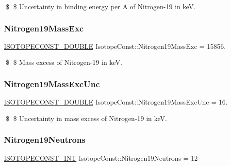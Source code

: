 \$ \$ Uncertainty in binding energy per A of Nitrogen-\/19 in keV. \mbox{\label{group___isotope_const-_nitrogen-_n19_ga2602baef8d8e6e13079427247e149719}} 
\subsubsection{\texorpdfstring{Nitrogen19\+Mass\+Exc}{Nitrogen19MassExc}}
{\footnotesize\ttfamily \mbox{\hyperlink{group___isotope_const-_macros_ga8f45a7272ce02c0b4c65c44636ed719a}{I\+S\+O\+T\+O\+P\+E\+C\+O\+N\+S\+T\+\_\+\+D\+O\+U\+B\+LE}} Isotope\+Const\+::\+Nitrogen19\+Mass\+Exc = 15856.}

\$ \$ Mass excess of Nitrogen-\/19 in keV. \mbox{\label{group___isotope_const-_nitrogen-_n19_gafb5e58f62f5e6fe8a36853d17649486b}} 
\subsubsection{\texorpdfstring{Nitrogen19\+Mass\+Exc\+Unc}{Nitrogen19MassExcUnc}}
{\footnotesize\ttfamily \mbox{\hyperlink{group___isotope_const-_macros_ga8f45a7272ce02c0b4c65c44636ed719a}{I\+S\+O\+T\+O\+P\+E\+C\+O\+N\+S\+T\+\_\+\+D\+O\+U\+B\+LE}} Isotope\+Const\+::\+Nitrogen19\+Mass\+Exc\+Unc = 16.}

\$ \$ Uncertainty in mass excess of Nitrogen-\/19 in keV. \mbox{\label{group___isotope_const-_nitrogen-_n19_gab844562a39de010e614224c03434efc2}} 
\subsubsection{\texorpdfstring{Nitrogen19\+Neutrons}{Nitrogen19Neutrons}}
{\footnotesize\ttfamily \mbox{\hyperlink{group___isotope_const-_macros_ga5f18360b3e99483a35c32d789e62621c}{I\+S\+O\+T\+O\+P\+E\+C\+O\+N\+S\+T\+\_\+\+I\+NT}} Isotope\+Const\+::\+Nitrogen19\+Neutrons = 12}


